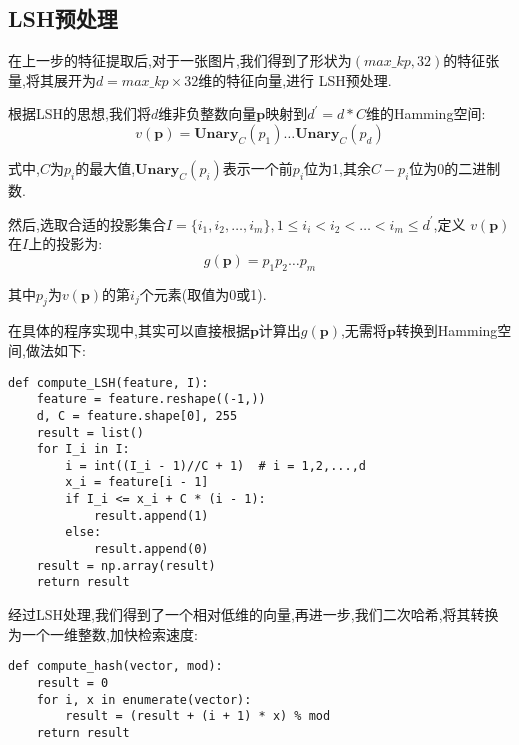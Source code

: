 \documentclass[a4paper]{article}
\begin{document}
        \subsection{LSH预处理}
在上一步的特征提取后,对于一张图片,我们得到了形状为$(max\_kp,32)$的特征张量,将其展开为$d=max\_kp\times32$维的特征向量,进行
LSH预处理.

根据LSH的思想,我们将$d$维非负整数向量$\mathbf{p}$映射到$d^{'} = d * C$维的Hamming空间:
$$v(\mathbf{p}) = \mathbf{Unary}_C(p_1)\dots \mathbf{Unary}_C(p_d)$$

式中,$C$为$p_i$的最大值,$\mathbf{Unary}_C(p_i)$表示一个前$p_i$位为1,其余$C-p_i$位为0的二进制数.

然后,选取合适的投影集合$I = \{i_1,i_2,\dots,i_m \},1\leq i_i < i_2 < \dots < i_m \leq d^{'}$,定义
$v(\mathbf{p})$在$I$上的投影为:
$$
g(\mathbf{p}) = p_1 p_2 \dots p_m
$$

其中$p_j$为$v(\mathbf{p})$的第$i_j$个元素(取值为0或1).

在具体的程序实现中,其实可以直接根据$\mathbf{p}$计算出$g(\mathbf{p})$,无需将$\mathbf{p}$转换到Hamming空间,做法如下:

\begin{verbatim}
def compute_LSH(feature, I):
    feature = feature.reshape((-1,))
    d, C = feature.shape[0], 255
    result = list()
    for I_i in I:
        i = int((I_i - 1)//C + 1)  # i = 1,2,...,d
        x_i = feature[i - 1]
        if I_i <= x_i + C * (i - 1):
            result.append(1)
        else:
            result.append(0)
    result = np.array(result)
    return result
\end{verbatim}

经过LSH处理,我们得到了一个相对低维的向量,再进一步,我们二次哈希,将其转换为一个一维整数,加快检索速度:
\begin{verbatim}
def compute_hash(vector, mod):
    result = 0
    for i, x in enumerate(vector):
        result = (result + (i + 1) * x) % mod
    return result
\end{verbatim}
\end{document}
